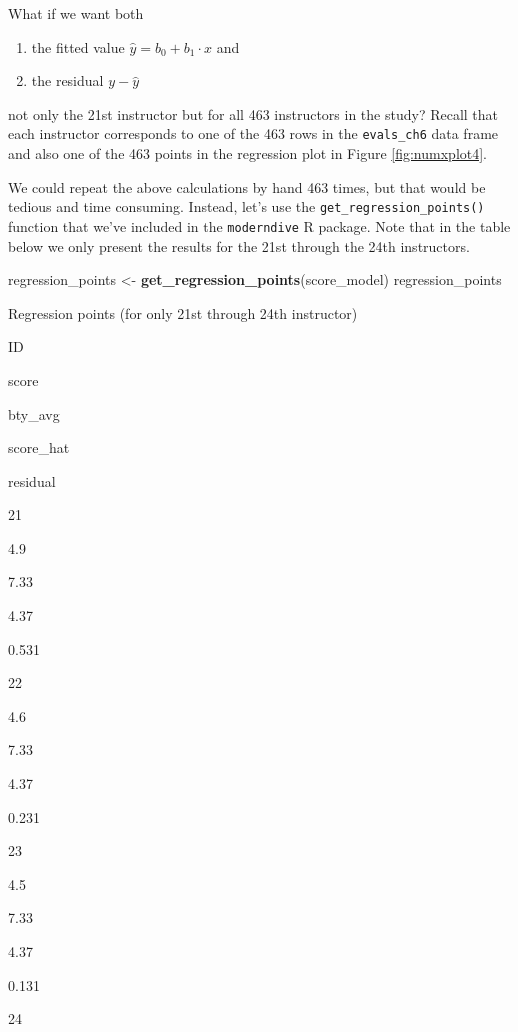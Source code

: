 \documentclass[12pt,]{krantz}
\makeatletter
\newenvironment{Shaded}{\begin{snugshade}}{\end{snugshade}}
\newcommand{\KeywordTok}[1]{\textcolor[rgb]{0.27,0.27,0.27}{\textbf{#1}}}
\newcommand{\StringTok}[1]{\textcolor[rgb]{0.5,0.5,0.5}{#1}}
\newcommand{\NormalTok}[1]{#1}
\providecommand{\tightlist}{%
  \setlength{\itemsep}{0pt}\setlength{\parskip}{0pt}}
\newenvironment{kframe}{%
\medskip{}
\setlength{\fboxsep}{.8em}
 \def\at@end@of@kframe{}%
 \ifinner\ifhmode%
  \def\at@end@of@kframe{\end{minipage}}%
  \begin{minipage}{\columnwidth}%
 \fi\fi%
 \def\FrameCommand##1{\hskip\@totalleftmargin \hskip-\fboxsep
 \colorbox{shadecolor}{##1}\hskip-\fboxsep
     \hskip-\linewidth \hskip-\@totalleftmargin \hskip\columnwidth}%
 \MakeFramed {\advance\hsize-\width
   \@totalleftmargin\z@ \linewidth\hsize
   \@setminipage}}%
 {\par\unskip\endMakeFramed%
 \at@end@of@kframe}
\renewenvironment{Shaded}{\begin{kframe}}{\end{kframe}}
\makeatother
\begin{document}
What if we want both

\begin{enumerate}
\def\labelenumi{\arabic{enumi}.}
\tightlist
\item
  the fitted value \(\widehat{y} = b_0 + b_1 \cdot x\) and
\item
  the residual \(y - \widehat{y}\)
\end{enumerate}

not only the 21st instructor but for all 463 instructors in the study?
Recall that each instructor corresponds to one of the 463 rows in the
\texttt{evals\_ch6} data frame and also one of the 463 points in the
regression plot in Figure \ref{fig:numxplot4}.

We could repeat the above calculations by hand 463 times, but that would
be tedious and time consuming. Instead, let's use the
\texttt{get\_regression\_points()} function that we've included in the
\texttt{moderndive} R package. Note that in the table below we only
present the results for the 21st through the 24th instructors.

\begin{Shaded}
\begin{Highlighting}[]
\NormalTok{regression_points <-}\StringTok{ }\KeywordTok{get_regression_points}\NormalTok{(score_model)}
\NormalTok{regression_points}
\end{Highlighting}
\end{Shaded}

\label{tab:unnamed-chunk-182}Regression points (for only 21st through 24th
instructor)

ID

score

bty\_avg

score\_hat

residual

21

4.9

7.33

4.37

0.531

22

4.6

7.33

4.37

0.231

23

4.5

7.33

4.37

0.131

24
\end{document}
